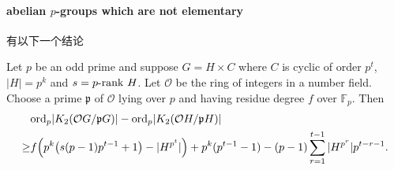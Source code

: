 \paragraph{abelian $p$-groups which are not elementary} %
\label{par:abelian_}
有以下一个结论
\begin{prop}
	Let $p$ be an odd prime and suppose $G=H \times C$ where $C$ is cyclic of
order $p^t$,  $|H|  =p^k$  and $s=p\mbox{-}\mathrm{rank\ } H$. Let $\mathcal{O}$ be the ring of integers in a number field. Choose a prime $\mathfrak{p}$ of $\mathcal{O}$ lying over $p$ and having residue degree $f$ over $\mathbb{F}_p$. Then
\begin{align*}
&\mathrm{ord}_p |K_2(\mathcal{O}G/\mathfrak{p}G)|-\mathrm{ord}_p |K_2(\mathcal{O}H/\mathfrak{p}H)|\\
\geq & f\Big(p^k\big(s(p-1)p^{t-1} + 1\big)-|H^{p^t}|\Big) +p^k(p^{t-1}-1)- (p-1) \sum_{r=1}^{t-1}|H^{p^r}|p^{t-r-1}.
\end{align*}


\end{prop}

